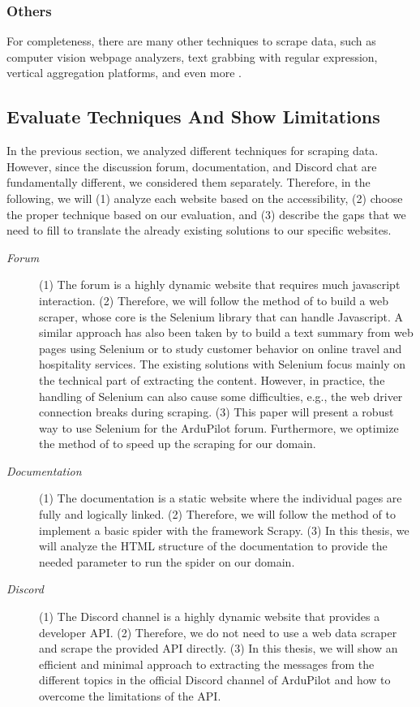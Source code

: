 \subsubsection{Others}
For completeness, there are many other techniques to scrape data, such as computer vision webpage analyzers, text grabbing with regular expression, vertical aggregation platforms, and even more \cite{sirisuriya2015comparative}.


\subsection{Evaluate Techniques And Show Limitations}\label{subsec:evaluation-of-the-correct-technique}
In the previous section, we analyzed different techniques for scraping data.
However, since the discussion forum, documentation, and Discord chat are fundamentally different, we considered them separately.
Therefore, in the following, we will (1) analyze each website based on the accessibility, (2) choose the proper technique based on our evaluation, and (3) describe the gaps that we need to fill to translate the already existing solutions to our specific websites.
\begin{description}
    \item[\textit{Forum}] (1) The forum is a highly dynamic website that requires much javascript interaction.
    (2) Therefore, we will follow the method of \cite{mitchell2018web} to build a web scraper, whose core is the Selenium library that can handle Javascript.
    A similar approach has also been taken by \cite{manjari2020extractive} to build a text summary from web pages using Selenium or \cite{han2021web} to study customer behavior on online travel and hospitality services.
    The existing solutions with Selenium focus mainly on the technical part of extracting the content.
    However, in practice, the handling of Selenium can also cause some difficulties, e.g., the web driver connection breaks during scraping.
    (3) This paper will present a robust way to use Selenium for the ArduPilot forum.
    Furthermore, we optimize the method of \cite{mitchell2018web} to speed up the scraping for our domain.
    \item[\textit{Documentation}] (1) The documentation is a static website where the individual pages are fully and logically linked.
    (2) Therefore, we will follow the method of \cite{kouzis2016learning} to implement a basic spider with the framework Scrapy.
    (3) In this thesis, we will analyze the \ac{HTML} structure of the documentation to provide the needed parameter to run the spider on our domain.
    \item[\textit{Discord}] (1) The Discord channel is a highly dynamic website that provides a developer \ac{API}.
    (2) Therefore, we do not need to use a web data scraper and scrape the provided \ac{API} directly.
    (3) In this thesis, we will show an efficient and minimal approach to extracting the messages from the different topics in the official Discord channel of ArduPilot and how to overcome the limitations of the \ac{API}.
\end{description}

